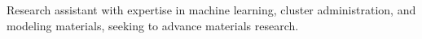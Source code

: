 Research assistant with expertise in machine learning, cluster administration, and modeling materials, seeking to advance materials research.
